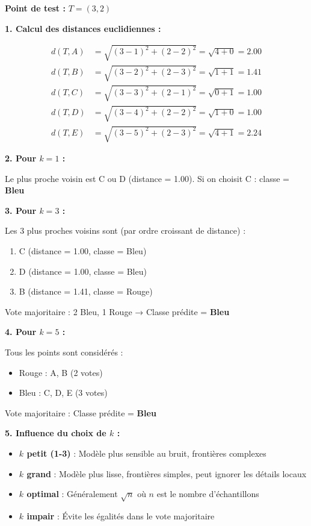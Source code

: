 \documentclass[11pt,a4paper]{article}
\begin{document}
\begin{solutionbox}
\textbf{Point de test :} $T = (3, 2)$

\textbf{1. Calcul des distances euclidiennes :}

\begin{align*}
d(T, A) &= \sqrt{(3-1)^2 + (2-2)^2} = \sqrt{4 + 0} = 2.00 \\
d(T, B) &= \sqrt{(3-2)^2 + (2-3)^2} = \sqrt{1 + 1} = 1.41 \\
d(T, C) &= \sqrt{(3-3)^2 + (2-1)^2} = \sqrt{0 + 1} = 1.00 \\
d(T, D) &= \sqrt{(3-4)^2 + (2-2)^2} = \sqrt{1 + 0} = 1.00 \\
d(T, E) &= \sqrt{(3-5)^2 + (2-3)^2} = \sqrt{4 + 1} = 2.24
\end{align*}

\textbf{2. Pour $k=1$ :}

Le plus proche voisin est C ou D (distance = 1.00). Si on choisit C : classe = \textbf{Bleu}

\textbf{3. Pour $k=3$ :}

Les 3 plus proches voisins sont (par ordre croissant de distance) :
\begin{enumerate}
    \item C (distance = 1.00, classe = Bleu)
    \item D (distance = 1.00, classe = Bleu)
    \item B (distance = 1.41, classe = Rouge)
\end{enumerate}

Vote majoritaire : 2 Bleu, 1 Rouge → Classe prédite = \textbf{Bleu}

\textbf{4. Pour $k=5$ :}

Tous les points sont considérés :
\begin{itemize}
    \item Rouge : A, B (2 votes)
    \item Bleu : C, D, E (3 votes)
\end{itemize}

Vote majoritaire : Classe prédite = \textbf{Bleu}

\textbf{5. Influence du choix de $k$ :}
\begin{itemize}
    \item \textbf{$k$ petit (1-3)} : Modèle plus sensible au bruit, frontières complexes
    \item \textbf{$k$ grand} : Modèle plus lisse, frontières simples, peut ignorer les détails locaux
    \item \textbf{$k$ optimal} : Généralement $\sqrt{n}$ où $n$ est le nombre d'échantillons
    \item \textbf{$k$ impair} : Évite les égalités dans le vote majoritaire
\end{itemize}
\end{solutionbox}
\end{document}
